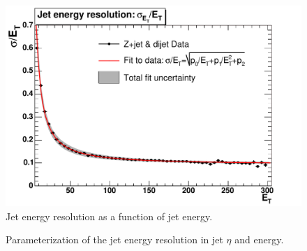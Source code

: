 \begin{figure}[htb!]
 \centering
 \includegraphics[scale=0.6,keepaspectratio=true]
{./MetModel_JER.pdf}
 \caption{Jet energy resolution as a function of jet energy.}
 \label{fig:MetModel_JERwithJetEt}
\end{figure}

\begin{figure}[htb!]
 \centering
{}
\caption{Parameterization of the jet energy resolution in jet $\eta$ and energy.}
\label{fig:MetModel_JERforEtEtaBin}
\end{figure}

